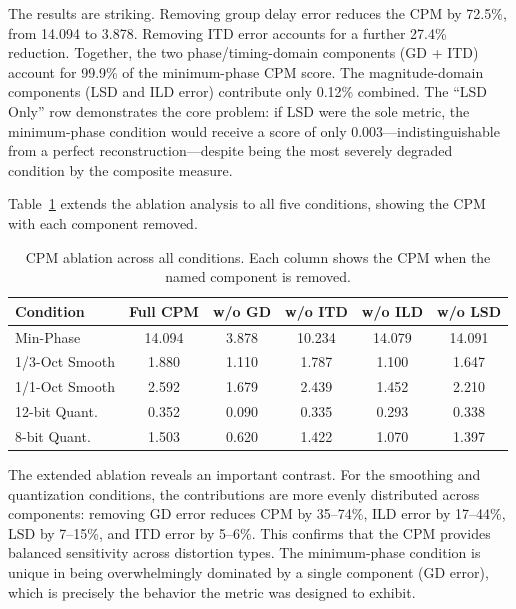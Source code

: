 \documentclass[12pt,a4paper]{article}
\begin{document}
The results are striking. Removing group delay error reduces the CPM by 72.5\%, from 14.094 to 3.878. Removing ITD error accounts for a further 27.4\% reduction. Together, the two phase/timing-domain components (GD + ITD) account for 99.9\% of the minimum-phase CPM score. The magnitude-domain components (LSD and ILD error) contribute only 0.12\% combined. The ``LSD Only'' row demonstrates the core problem: if LSD were the sole metric, the minimum-phase condition would receive a score of only 0.003---indistinguishable from a perfect reconstruction---despite being the most severely degraded condition by the composite measure.

Table~\ref{tab:ablation_all} extends the ablation analysis to all five conditions, showing the CPM with each component removed.

\begin{table}[h!]
\centering
\caption{CPM ablation across all conditions. Each column shows the CPM when the named component is removed.}
\label{tab:ablation_all}
\small
\begin{tabular}{lccccc}
\toprule
\textbf{Condition} & \textbf{Full CPM} & \textbf{w/o GD} & \textbf{w/o ITD} & \textbf{w/o ILD} & \textbf{w/o LSD} \\
\midrule
Min-Phase      & 14.094 & 3.878  & 10.234 & 14.079 & 14.091 \\
1/3-Oct Smooth & 1.880  & 1.110  & 1.787  & 1.100  & 1.647  \\
1/1-Oct Smooth & 2.592  & 1.679  & 2.439  & 1.452  & 2.210  \\
12-bit Quant.  & 0.352  & 0.090  & 0.335  & 0.293  & 0.338  \\
8-bit Quant.   & 1.503  & 0.620  & 1.422  & 1.070  & 1.397  \\
\bottomrule
\end{tabular}
\end{table}

The extended ablation reveals an important contrast. For the smoothing and quantization conditions, the contributions are more evenly distributed across components: removing GD error reduces CPM by 35--74\%, ILD error by 17--44\%, LSD by 7--15\%, and ITD error by 5--6\%. This confirms that the CPM provides balanced sensitivity across distortion types. The minimum-phase condition is unique in being overwhelmingly dominated by a single component (GD error), which is precisely the behavior the metric was designed to exhibit.

\end{document}
